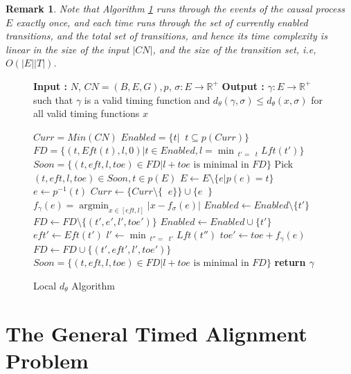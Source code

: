 \documentclass[conference]{IEEEtran}
\makeatletter
\newcommand{\removelatexerror}{\let\@latex@error\@gobble}
\DeclareMathOperator*{\argmin}{argmin}
\DeclareMathOperator*{\pre}{^\bullet}
\newtheorem{remark}{Remark}
\makeatother
\begin{document}
	
	\begin{remark} Note that Algorithm \ref{DelayAlgo} runs through the events of the causal process $E$ exactly once, and each time runs through the set of currently enabled transitions, and the total set of transitions, and hence its time complexity is linear in the size of the input $|CN|$, and the size of the transition set, i.e, $O(|E||T|)$. 
	\end{remark}
	\begin{figure}[!t]
		\removelatexerror
		\begin{algorithm}[H]
			\caption{Local $d_\theta$ Algorithm}
			\label{DelayAlgo}
			\begin{algorithmic}[1]
				\State \textbf{Input : }  $N$, $CN = (B, E, G), p$, $\sigma : E \to \mathbb{R}^+$
				\State \textbf{Output : }  $\gamma : E \to \mathbb{R}^+$ such that $\gamma$ is a valid timing function and $d_\theta(\gamma, \sigma)  \leq  {d_\theta(x, \sigma)}$ for all valid timing functions $x$ 
				
				\State $Curr = Min(CN)$
				\State $Enabled = \{t | \pre t \subseteq p(Curr)\}$
				\State $FD = \{(t, Eft(t), l, 0) | {t \in Enabled}, {l = \min_{\pre t' = \pre t}{Lft(t')}}\}$
				\State $Soon = \{{(t, eft, l, toe) \in FD} | {l+toe} \textrm{ is minimal in } FD\}$
				\State Pick $(t, eft, l, toe) \in Soon, {t \in p(E)}$ 
				\State $E \gets E \setminus\{e | p(e) = t\}$
				\State $e \gets p^{-1}(t)$
				\State $Curr \gets \{Curr \setminus \{\pre e\}\} \cup \{e \pre\} $
				\State $f_{\gamma}(e) = \argmin_{x \in [eft, l]}|x - f_{\sigma}(e)|$
				\ForAll{$t' \in T \wedge \pre t' = \pre t$} 
				\State $Enabled \gets Enabled \setminus\{t'\}$
				\State $FD \gets FD \setminus\{(t', e', l', toe')\}$
				\EndFor
				\ForAll{$t' \in T \wedge t' \pre = t \pre$}
				\State $Enabled \gets Enabled \cup \{t'\}$
				\State $eft' \gets Eft(t')$
				\State $l' \gets \min_{\pre t'' = \pre t'}{Lft(t'')}$
				\State $toe' \gets toe + f_\gamma(e)$
				\State $FD \gets FD \cup \{(t', eft', l', toe')\}$
				\EndFor
				\State $Soon = \{{(t, eft, l, toe) \in FD} | {l+toe} \textrm{ is minimal in } FD \}$
				\EndWhile
				\State \textbf{return $\gamma$}
			\end{algorithmic}
		\end{algorithm}
		
	\end{figure}
	\section{The General Timed Alignment Problem} \label{align}
	
\end{document}

